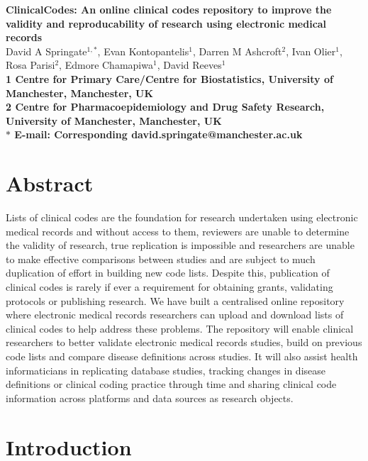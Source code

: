 \documentclass[10pt]{article}
\date{}
\begin{document}
\begin{flushleft}
{\Large
\textbf{ClinicalCodes: An online clinical codes repository to improve the validity and reproducability of research using electronic medical records}
}
\\
David A Springate$^{1,\ast}$, 
Evan Kontopantelis$^{1}$,
Darren M Ashcroft$^{2}$,
Ivan Olier$^{1}$,
Rosa Parisi$^{2}$,
Edmore Chamapiwa$^{1}$,
David Reeves$^{1}$
\\
\bf{1} Centre for Primary Care/Centre for Biostatistics, University of Manchester, Manchester, UK
\\
\bf{2} Centre for Pharmacoepidemiology and Drug Safety Research, University of Manchester, Manchester, UK
\\
$\ast$ E-mail: Corresponding david.springate@manchester.ac.uk
\end{flushleft}

\section*{Abstract}

Lists of clinical codes are the foundation for research undertaken using electronic medical records and without access to them, reviewers are unable to determine the validity of research, true replication is impossible and researchers are unable to make effective comparisons between studies and are subject to much duplication of effort in building new code lists.  Despite this, publication of clinical codes is rarely if ever a requirement for obtaining grants, validating protocols or publishing research.  We have built a centralised online repository where electronic medical records researchers can upload and download lists of clinical codes to help address these problems.  The repository will enable clinical researchers to better validate electronic medical records studies, build on previous code lists and compare disease definitions across studies.  It will also assist health informaticians in replicating database studies, tracking changes in disease definitions or clinical coding practice through time and sharing clinical code information across platforms and data sources as research objects. 

\section*{Introduction}
\end{document}
